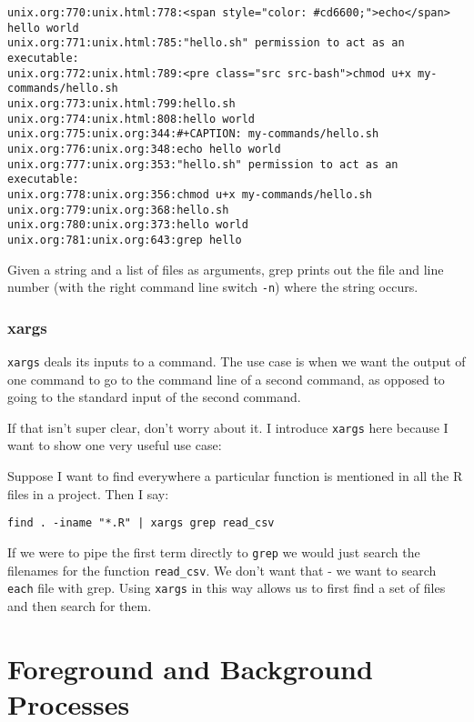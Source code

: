 \documentclass[11pt]{article}
\begin{document}
\begin{verbatim}
unix.org:770:unix.html:778:<span style="color: #cd6600;">echo</span> hello world
unix.org:771:unix.html:785:"hello.sh" permission to act as an executable:
unix.org:772:unix.html:789:<pre class="src src-bash">chmod u+x my-commands/hello.sh
unix.org:773:unix.html:799:hello.sh
unix.org:774:unix.html:808:hello world
unix.org:775:unix.org:344:#+CAPTION: my-commands/hello.sh
unix.org:776:unix.org:348:echo hello world
unix.org:777:unix.org:353:"hello.sh" permission to act as an executable:
unix.org:778:unix.org:356:chmod u+x my-commands/hello.sh
unix.org:779:unix.org:368:hello.sh
unix.org:780:unix.org:373:hello world
unix.org:781:unix.org:643:grep hello 
\end{verbatim}

Given a string and a list of files as arguments, grep prints out the
file and line number (with the right command line switch \texttt{-n}) where
the string occurs.

\subsubsection{xargs}
\label{sec:org75809f3}

\texttt{xargs} deals its inputs to a command. The use case is when we want
the output of one command to go to the command line of a second
command, as opposed to going to the standard input of the second
command.

If that isn't super clear, don't worry about it. I introduce \texttt{xargs}
here because I want to show one very useful use case:

Suppose I want to find everywhere a particular function is mentioned
in all the R files in a project. Then I say:

\begin{verbatim}
find . -iname "*.R" | xargs grep read_csv
\end{verbatim}

If we were to pipe the first term directly to \texttt{grep} we would just
search the filenames for the function \texttt{read\_csv}. We don't want that -
we want to search \texttt{each} file with grep. Using \texttt{xargs} in this way
allows us to first find a set of files and then search for them.

\section{Foreground and Background Processes}
\label{sec:org865da40}
\end{document}

